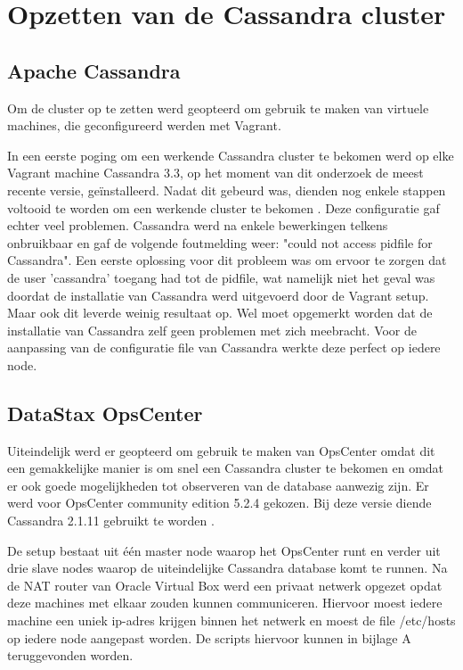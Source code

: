 \chapter{Opzetten van de Cassandra cluster}
\label{ch:cassandra_cluster}

\section{Apache Cassandra}
Om de cluster op te zetten werd geopteerd om gebruik te maken van virtuele machines, die geconfigureerd werden met Vagrant.

In een eerste poging om een werkende Cassandra cluster te bekomen werd op elke Vagrant machine Cassandra 3.3, op het moment van dit onderzoek de meest recente versie, geïnstalleerd.
Nadat dit gebeurd was, dienden nog enkele stappen voltooid te worden om een werkende cluster te bekomen \citep{DataStax2016}.
Deze configuratie gaf echter veel problemen.
Cassandra werd na enkele bewerkingen telkens onbruikbaar en gaf de volgende foutmelding weer: "could not access pidfile for Cassandra".
Een eerste oplossing voor dit probleem was om ervoor te zorgen dat de user 'cassandra' toegang had tot de pidfile, wat namelijk niet het geval was doordat de installatie van Cassandra werd uitgevoerd door de Vagrant setup.
Maar ook dit leverde weinig resultaat op.
Wel moet opgemerkt worden dat de installatie van Cassandra zelf geen problemen met zich meebracht.
Voor de aanpassing van de configuratie file van Cassandra werkte deze perfect op iedere node.

\section{DataStax OpsCenter}

Uiteindelijk werd er geopteerd om gebruik te maken van OpsCenter omdat dit een gemakkelijke manier is om snel een Cassandra cluster te bekomen en omdat er ook goede mogelijkheden tot observeren van de database aanwezig zijn.
Er werd voor OpsCenter community edition 5.2.4 gekozen.
Bij deze versie diende Cassandra 2.1.11 gebruikt te worden \citep{Cantoni2016}.

De setup bestaat uit één master node waarop het OpsCenter runt en verder uit drie slave nodes waarop de uiteindelijke Cassandra database komt te runnen.
Na de NAT router van Oracle Virtual Box werd een privaat netwerk opgezet opdat deze machines met elkaar zouden kunnen communiceren.
Hiervoor moest iedere machine een uniek ip-adres krijgen binnen het netwerk en moest de file /etc/hosts op iedere node aangepast worden.
De scripts hiervoor kunnen in bijlage A teruggevonden worden.

